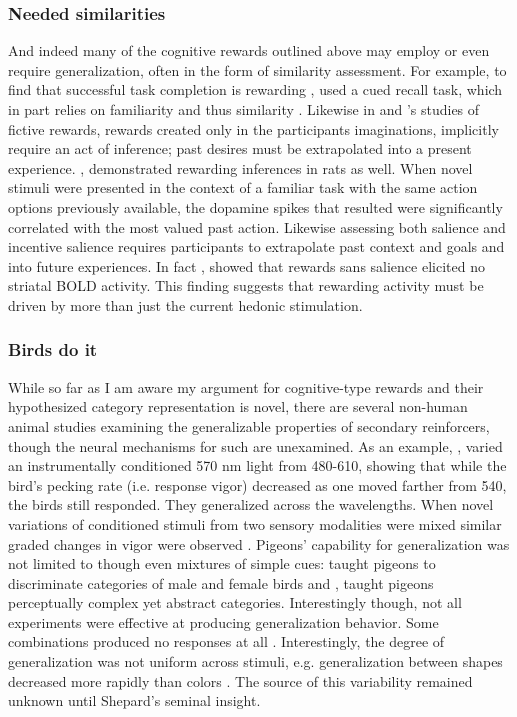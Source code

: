 \documentclass[doc,12pt]{apa}        %
\begin{document}
\subsubsection{Needed similarities}
\label{subsub:needed}
And indeed many of the cognitive rewards outlined above may employ or even require generalization, often in the form of similarity assessment.  For example, to find that successful task completion is rewarding , used a cued recall task, which in part relies on familiarity \cite{Jacoby:1991p9096} and thus similarity \cite{Nosofsky:1988p9098}.  Likewise in  and 's studies of fictive rewards, rewards created only in the participants imaginations, implicitly require an act of inference; past desires must be extrapolated into a present experience.  , demonstrated rewarding inferences in rats as well.  When novel stimuli were presented in the context of a familiar task with the same action options previously available, the dopamine spikes that resulted were significantly correlated with the most valued past action.  Likewise assessing both salience and incentive salience requires participants to extrapolate past context and goals and into future experiences.  In fact , showed that rewards sans salience elicited no striatal BOLD activity.  This finding suggests that rewarding activity must be driven by more than just the current hedonic stimulation.

\subsubsection{Birds do it}
\label{subsub:birds}
While so far as I am aware my argument for cognitive-type rewards and their hypothesized category representation is novel, there are several non-human animal studies examining the generalizable properties of secondary reinforcers, though the neural mechanisms for such are unexamined.  As an example, , varied an instrumentally conditioned 570 nm light from 480-610, showing that while the bird's pecking rate (i.e. response vigor) decreased as one moved farther from 540, the birds still responded.  They generalized across the wavelengths.  When novel variations of conditioned stimuli from two sensory modalities were mixed similar graded changes in vigor were observed  \cite{Guttman:1956p8355}.  Pigeons' capability for generalization was not limited to though even mixtures of simple cues: \cite{Nakamura:2006p9093} taught pigeons to discriminate categories of male and female birds and , taught pigeons perceptually complex yet abstract categories.  Interestingly though, not all experiments were effective at producing generalization behavior.  Some combinations produced no responses at all \cite{Blough:2001p8408,Simmons:2008p8405,Urcuioli:2001p8359}.  Interestingly, the degree of generalization was not uniform across stimuli, e.g. generalization between shapes decreased more rapidly than colors \cite{Shepard:1987p9102}.  The source of this variability remained unknown until Shepard's seminal insight.
\end{document}
